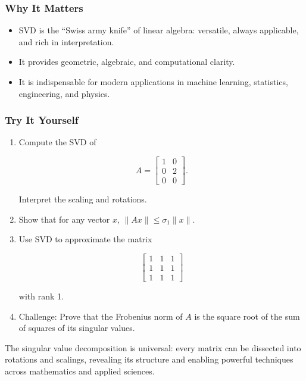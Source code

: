 \documentclass[
  letterpaper,
  DIV=11,
  numbers=noendperiod]{scrreprt}
\providecommand{\tightlist}{%
  \setlength{\itemsep}{0pt}\setlength{\parskip}{0pt}}
\begin{document}
\subsubsection{Why It Matters}\label{why-it-matters-77}

\begin{itemize}
\tightlist
\item
  SVD is the ``Swiss army knife'' of linear algebra: versatile, always
  applicable, and rich in interpretation.
\item
  It provides geometric, algebraic, and computational clarity.
\item
  It is indispensable for modern applications in machine learning,
  statistics, engineering, and physics.
\end{itemize}

\subsubsection{Try It Yourself}\label{try-it-yourself-80}

\begin{enumerate}
\def\labelenumi{\arabic{enumi}.}
\item
  Compute the SVD of

  \[
  A = \begin{bmatrix}1 & 0 \\ 0 & 2 \\ 0 & 0\end{bmatrix}.
  \]

  Interpret the scaling and rotations.
\item
  Show that for any vector \(x\), \(\|Ax\| \leq \sigma_1 \|x\|\).
\item
  Use SVD to approximate the matrix

  \[
  \begin{bmatrix}1 & 1 & 1 \\ 1 & 1 & 1 \\ 1 & 1 & 1\end{bmatrix}
  \]

  with rank 1.
\item
  Challenge: Prove that the Frobenius norm of \(A\) is the square root
  of the sum of squares of its singular values.
\end{enumerate}

The singular value decomposition is universal: every matrix can be
dissected into rotations and scalings, revealing its structure and
enabling powerful techniques across mathematics and applied sciences.
\end{document}
